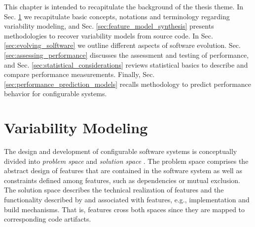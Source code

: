 This chapter is intended to recapitulate the background of the thesis theme. In
Sec. \ref{sec:variability_modeling} we recapitulate basic concepts, notations
and terminology regarding variability modeling, and Sec.
\ref{sec:feature_model_synthesis} presents methodologies to recover variability
models from source code. In Sec. \ref{sec:evolving_solftware} we outline
different aspects of software evolution. Sec. \ref{sec:assessing_performance}
discusses the assessment and testing of performance, and Sec.
\ref{sec:statistical_considerations} reviews statistical basics to describe and
compare performance measurements. Finally, Sec.
\ref{sec:performance_prediction_models} recalls methodology to predict
performance behavior for configurable systems.

\section{Variability Modeling} \label{sec:variability_modeling}
The design and development of configurable software systems is conceptually
divided into \emph{problem space} and \emph{solution space} \citep{czarnecki_generative_2000}. The problem space
comprises the abstract design of features that are contained in the software system as well as
constraints defined among features, such as dependencies or mutual exclusion.
The solution space describes the technical realization of features and the
functionality described by and associated with features, e.g., implementation
and build mechanisms. That is, features cross both spaces since they are mapped
to corresponding code artifacts.

